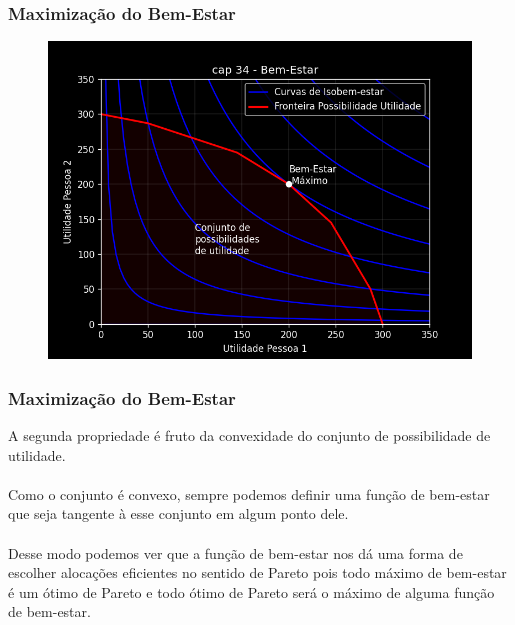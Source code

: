 \documentclass{beamer}[10]
\begin{document}
\begin{frame}
	\frametitle{Maximização do Bem-Estar}

	\begin{figure}[H]
		\centering
		\includegraphics[scale=0.55]{cap34_3-maximizacao_bem_estar.png}
	\end{figure}

\end{frame}

\begin{frame}
	\frametitle{Maximização do Bem-Estar}

	A segunda propriedade é fruto da convexidade do conjunto de possibilidade de utilidade.
	\\~\\
	Como o conjunto é convexo, sempre podemos definir uma função de bem-estar que seja tangente à esse conjunto em algum ponto dele.
	\\~\\
	Desse modo podemos ver que a função de bem-estar nos dá uma forma de escolher alocações eficientes no sentido de Pareto pois todo máximo de bem-estar é um ótimo de Pareto e todo ótimo de Pareto será o máximo de alguma função de bem-estar.

\end{frame}
\end{document}
